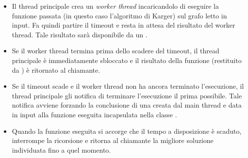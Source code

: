 \begin{itemize}
    \item Il thread principale crea un \textit{worker thread} incaricandolo di eseguire la funzione passata (in questo caso l'algoritmo di Karger) sul grafo letto in input. Fa quindi partire il timeout e resta in attesa del risultato del worker thread. Tale risultato sarà disponibile da un .
    \item Se il worker thread termina prima dello scadere del timeout, il thread principale è immediatamente sbloccato e il risultato della funzione (restituito da ) è ritornato al chiamante.
    \item Se il timeout scade e il worker thread non ha ancora terminato l'esecuzione, il thread principale gli notifica di terminare l'esecuzione il prima possibile. Tale notifica avviene forzando la conclusione di una  creata dal main thread e data in input alla funzione eseguita incapsulata nella classe .
    \item Quando la funzione eseguita si accorge che il tempo a disposizione è scaduto, interrompe la ricorsione e ritorna al chiamante la migliore soluzione individuata fino a quel momento.
\end{itemize}
